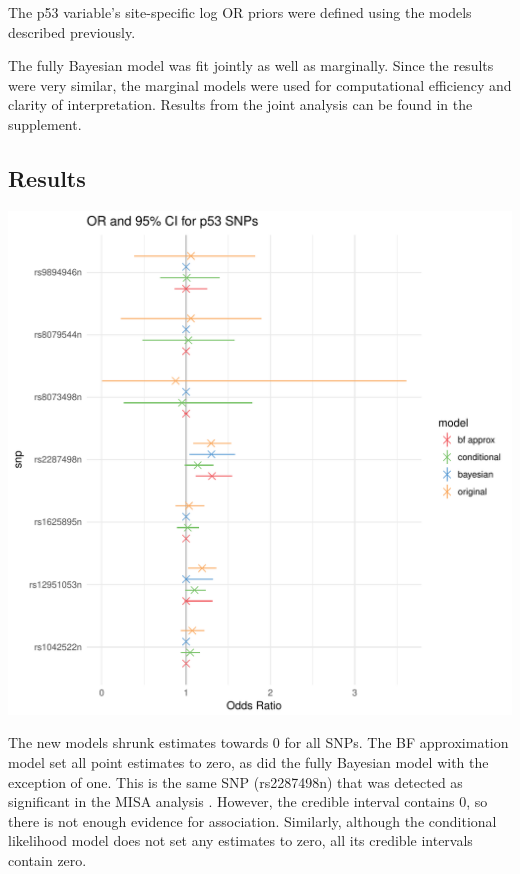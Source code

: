 \documentclass[AMA,STIX1COL]{WileyNJD-v2}\usepackage[]{graphicx}\usepackage[]{color}
\makeatletter
\def\maxwidth{ %
  \ifdim\Gin@nat@width>\linewidth
    \linewidth
  \else
    \Gin@nat@width
  \fi
}
\newenvironment{knitrout}{}{} %
\makeatother
\begin{document}
The p53 variable's site-specific log OR priors were defined using the models described previously.

The fully Bayesian model was fit jointly as well as marginally. Since the results were very similar, the marginal models were used for computational efficiency and clarity of interpretation. Results from the joint analysis can be found in the supplement.

\subsection{Results}






\begin{knitrout}
\color{fgcolor}
\includegraphics[width=\maxwidth]{figure/unnamed-chunk-38-1} 

\end{knitrout}

The new models shrunk estimates towards 0 for all SNPs. The BF approximation model set all point estimates to zero, as did the fully Bayesian model with the exception of one. This is the same SNP (rs2287498n) 
that was detected as significant in the MISA analysis \cite{schildkraut2010association}. However, the credible interval contains 0, so there is not enough evidence for association. Similarly, although the conditional likelihood model does not set any estimates to zero, all its credible intervals contain zero.
\end{document}
